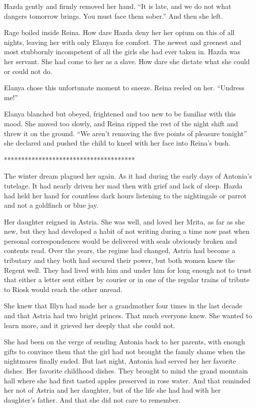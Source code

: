 \documentclass{article}
\begin{document}
	Hazda gently and firmly removed her hand. “It is late, and we do not what dangers tomorrow brings. You must face them sober.” And then she left.
	
	Rage boiled inside Reina. How dare Hazda deny her her opium on this of all nights, leaving her with only Elanya for comfort. The newest and greenest and most stubbornly incompetent of all the girls she had ever taken in. Hazda was her servant. She had come to her as a slave. How dare she dictate what she could or could not do. 
	
	Elanya chose this unfortunate moment to sneeze. Reina reeled on her. “Undress me!”
	
	Elanya blanched but obeyed, frightened and too new to be familiar with this mood. She moved too slowly, and Reina ripped the rest of the night shift and threw it on the ground. “We aren’t removing the five points of pleasure tonight” she declared and pushed the child to kneel with her face into Reina’s bush.
	
	**************************************
	
	The winter dream plagued her again. As it had during the early days of Antonia’s tutelage. It had nearly driven her mad then with grief and lack of sleep. Hazda had held her hand for countless dark hours listening to the nightingale or parrot and not a goldfinch or blue jay. 
	
	Her daughter reigned in Astria. She was well, and loved her Mrita, as far as she new, but they had developed a habit of not writing during a time now past when personal correspondences would be delivered with seals obviously broken and contents read. Over the years, the regime had changed, Astria had become a tributary and they both had secured their power, but both women knew the Regent well. They had lived with him and under him for long enough not to trust that either a letter sent either by courier or in one of the regular trains of tribute to Riosk would reach the other unread. 
	
	She knew that Illyn had made her a grandmother four times in the last decade and that Astria had two bright princes. That much everyone knew. She wanted to learn more, and it grieved her deeply that she could not.
	
	She had been on the verge of sending Antonia back to her parents, with enough gifts to convince them that the girl had not brought the family shame when the nightmares finally ended. But last night, Antonia had served her her favorite dishes. Her favorite childhood dishes. They brought to mind the grand mountain hall where she had first tasted apples preserved in rose water. And that reminded her not of Astria and her daughter, but of the life she had had with her daughter’s father. And that she did not care to remember.
	
\end{document}
